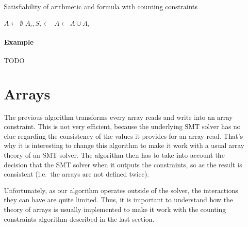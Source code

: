 \documentclass[]{article}
\begin{document}
{\begin{algorithm}[h]
\caption{Satisfiability of arithmetic and formula with counting constraints}
\begin{algorithmic}[1]
\State {}
    \State {}
    \State $A \gets \emptyset$
        \State $A_i, S_i \gets $ 
        \State $A \gets A \cup A_i$
            \State {}
            \State {}
        \EndIf
    \EndFor
    \State {}
    \State {}
    \State {}
    \State {}
    \State {}
    \State {}
        \State {}
        \State {}
    \EndIf
    \State {}
    \State {}
\EndWhile
\State {}
\end{algorithmic}
\label{arrayalgo}
\end{algorithm}

\paragraph{Example}\label{example-1}

TODO

\section{Arrays}\label{arrays}

The previous algorithm transforms every array reads and write into an
array constraint. This is not very efficient, because the underlying SMT
solver has no clue regarding the consistency of the values it provides
for an array read. That's why it is interesting to change this algorithm
to make it work with a usual array theory of an SMT solver. The
algorithm then has to take into account the decision that the SMT solver
when it outputs the constraints, so as the result is consistent
(i.e.~the arrays are not defined twice).

Unfortunately, as our algorithm operates outside of the solver, the
interactions they can have are quite limited. Thus, it is important to
understand how the theory of arrays is usually implemented to make it
work with the counting constraints algorithm described in the last
section.

}
\end{document}
